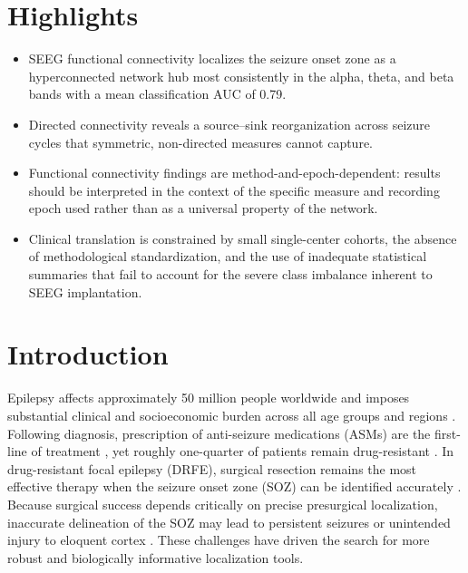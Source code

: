 \documentclass[12pt]{article}
\begin{document}
\section*{Highlights}
\begin{itemize}
  \item SEEG functional connectivity localizes the seizure onset zone as a hyperconnected network hub most consistently in the alpha, theta, and beta bands with a mean classification AUC of 0.79.
  \item Directed connectivity reveals a source--sink reorganization across seizure cycles that symmetric, non-directed measures cannot capture.
  \item Functional connectivity findings are method-and-epoch-dependent: results should be interpreted in the context of the specific measure and recording epoch used rather than as a universal property of the network.
  \item Clinical translation is constrained by small single-center cohorts, the absence of methodological standardization, and the use of inadequate statistical summaries that fail to account for the severe class imbalance inherent to SEEG implantation.
\end{itemize}


\section{Introduction}
Epilepsy affects approximately 50 million people worldwide and imposes substantial clinical and socioeconomic burden across all age groups and regions \cite{who2019epilepsy, WHO2025NeurologyCh2, Allers2015-hp, Chabolla2002-kz, Shorvon2011-qr}. Following diagnosis, prescription of anti-seizure medications (ASMs) are the first-line of treatment \cite{kanner2022antiseizure}, yet roughly one-quarter of patients remain drug-resistant \cite{gonzalez2015drug}. In drug-resistant focal epilepsy (DRFE), surgical resection remains the most effective therapy when the seizure onset zone (SOZ) can be identified accurately \cite{hsieh2023beyond}. Because surgical success depends critically on precise presurgical localization, inaccurate delineation of the SOZ may lead to persistent seizures or unintended injury to eloquent cortex \cite{luders2006epileptogenic}. These challenges have driven the search for more robust and biologically informative localization tools.
\end{document}
